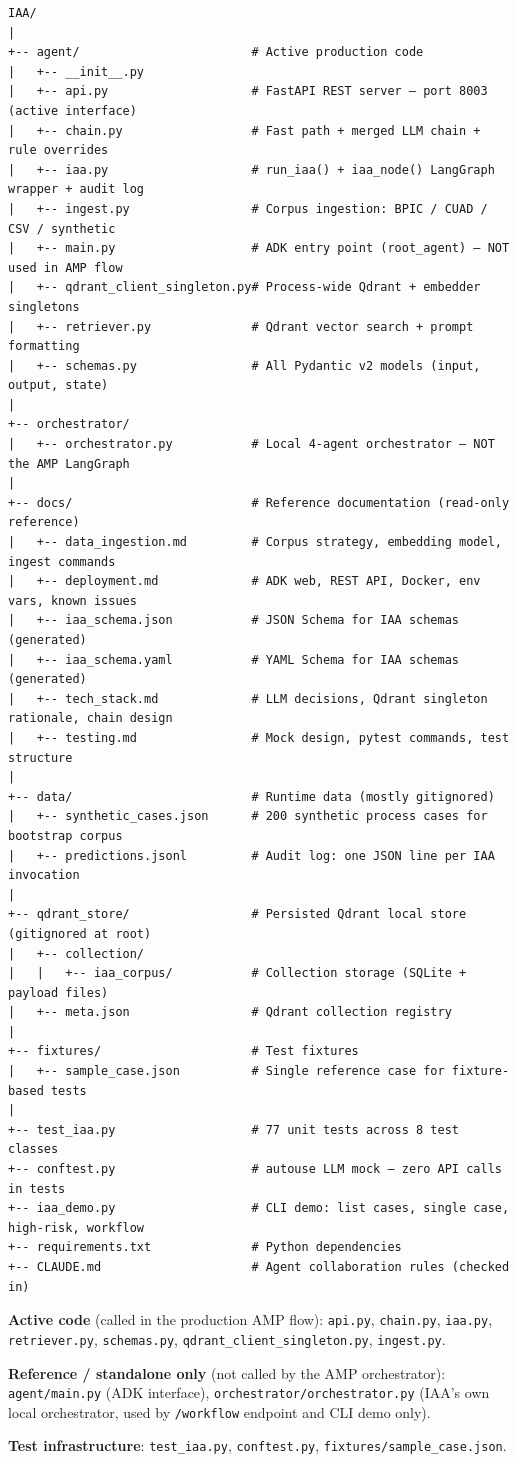 \documentclass[12pt,a4paper]{article}
\begin{document}
\begin{lstlisting}[style=ascii, caption={IAA directory tree with roles}]
IAA/
|
+-- agent/                        # Active production code
|   +-- __init__.py
|   +-- api.py                    # FastAPI REST server — port 8003 (active interface)
|   +-- chain.py                  # Fast path + merged LLM chain + rule overrides
|   +-- iaa.py                    # run_iaa() + iaa_node() LangGraph wrapper + audit log
|   +-- ingest.py                 # Corpus ingestion: BPIC / CUAD / CSV / synthetic
|   +-- main.py                   # ADK entry point (root_agent) — NOT used in AMP flow
|   +-- qdrant_client_singleton.py# Process-wide Qdrant + embedder singletons
|   +-- retriever.py              # Qdrant vector search + prompt formatting
|   +-- schemas.py                # All Pydantic v2 models (input, output, state)
|
+-- orchestrator/
|   +-- orchestrator.py           # Local 4-agent orchestrator — NOT the AMP LangGraph
|
+-- docs/                         # Reference documentation (read-only reference)
|   +-- data_ingestion.md         # Corpus strategy, embedding model, ingest commands
|   +-- deployment.md             # ADK web, REST API, Docker, env vars, known issues
|   +-- iaa_schema.json           # JSON Schema for IAA schemas (generated)
|   +-- iaa_schema.yaml           # YAML Schema for IAA schemas (generated)
|   +-- tech_stack.md             # LLM decisions, Qdrant singleton rationale, chain design
|   +-- testing.md                # Mock design, pytest commands, test structure
|
+-- data/                         # Runtime data (mostly gitignored)
|   +-- synthetic_cases.json      # 200 synthetic process cases for bootstrap corpus
|   +-- predictions.jsonl         # Audit log: one JSON line per IAA invocation
|
+-- qdrant_store/                 # Persisted Qdrant local store (gitignored at root)
|   +-- collection/
|   |   +-- iaa_corpus/           # Collection storage (SQLite + payload files)
|   +-- meta.json                 # Qdrant collection registry
|
+-- fixtures/                     # Test fixtures
|   +-- sample_case.json          # Single reference case for fixture-based tests
|
+-- test_iaa.py                   # 77 unit tests across 8 test classes
+-- conftest.py                   # autouse LLM mock — zero API calls in tests
+-- iaa_demo.py                   # CLI demo: list cases, single case, high-risk, workflow
+-- requirements.txt              # Python dependencies
+-- CLAUDE.md                     # Agent collaboration rules (checked in)
\end{lstlisting}

\textbf{Active code} (called in the production AMP flow):
\texttt{api.py}, \texttt{chain.py}, \texttt{iaa.py}, \texttt{retriever.py},
\texttt{schemas.py}, \texttt{qdrant\_client\_singleton.py}, \texttt{ingest.py}.

\textbf{Reference / standalone only} (not called by the AMP orchestrator):
\texttt{agent/main.py} (ADK interface), \texttt{orchestrator/orchestrator.py}
(IAA's own local orchestrator, used by \texttt{/workflow} endpoint and CLI demo only).

\textbf{Test infrastructure}:
\texttt{test\_iaa.py}, \texttt{conftest.py}, \texttt{fixtures/sample\_case.json}.
\end{document}
